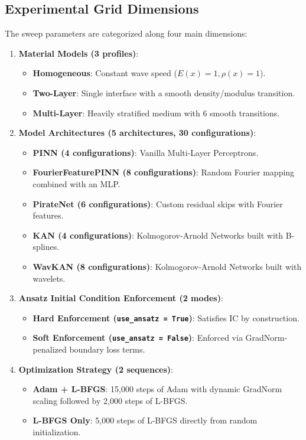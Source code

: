 \documentclass[11pt, a4paper]{article}
\begin{document}
\subsection{Experimental Grid Dimensions}

The sweep parameters are categorized along four main dimensions:

\begin{enumerate}
  \item \textbf{Material Models (3 profiles)}:
    \begin{itemize}
      \item \textbf{Homogeneous}: Constant wave speed ($E(x) = 1, \rho(x) = 1$).
      \item \textbf{Two-Layer}: Single interface with a smooth density/modulus transition.
      \item \textbf{Multi-Layer}: Heavily stratified medium with 6 smooth transitions.
    \end{itemize}
  \item \textbf{Model Architectures (5 architectures, 30 configurations)}:
    \begin{itemize}
      \item \textbf{PINN (4 configurations)}: Vanilla Multi-Layer Perceptrons.
      \item \textbf{FourierFeaturePINN (8 configurations)}: Random Fourier mapping combined with an MLP.
      \item \textbf{PirateNet (6 configurations)}: Custom residual skips with Fourier features.
      \item \textbf{KAN (4 configurations)}: Kolmogorov-Arnold Networks built with B-splines.
      \item \textbf{WavKAN (8 configurations)}: Kolmogorov-Arnold Networks built with wavelets.
    \end{itemize}
  \item \textbf{Ansatz Initial Condition Enforcement (2 modes)}:
    \begin{itemize}
      \item \textbf{Hard Enforcement (\texttt{use\_ansatz = True})}: Satisfies IC by construction.
      \item \textbf{Soft Enforcement (\texttt{use\_ansatz = False})}: Enforced via GradNorm-penalized boundary loss terms.
    \end{itemize}
  \item \textbf{Optimization Strategy (2 sequences)}:
    \begin{itemize}
      \item \textbf{Adam + L-BFGS}: 15,000 steps of Adam with dynamic GradNorm scaling followed by 2,000 steps of L-BFGS.
      \item \textbf{L-BFGS Only}: 5,000 steps of L-BFGS directly from random initialization.
    \end{itemize}
\end{enumerate}
\end{document}
